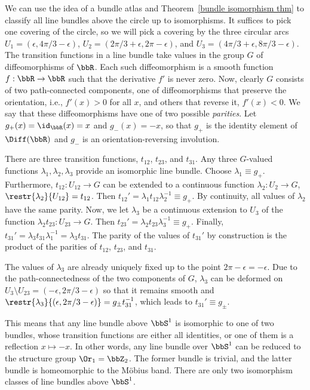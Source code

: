 \begin{example}\label{line bundles over S1}
    We can use the idea of a bundle atlas and Theorem~\ref{bundle isomorphism thm} to classify all line bundles above the circle up to isomorphisms. It suffices to pick one covering of the circle, so we will pick a covering by the three circular arcs $U_1=(\epsilon,4\pi/3-\epsilon)$, $U_2=(2\pi/3+\epsilon,2\pi-\epsilon)$, and $U_3=(4\pi/3+\epsilon,8\pi/3-\epsilon)$. The transition functions in a line bundle take values in the group $G$ of diffeomorphisms of $\bbR $. Each such diffeomorphism is a smooth function $f:\bbR \to\bbR $ such that the derivative $f'$ is never zero. Now, clearly $G$ consists of two path-connected components, one of diffeomorphisms that preserve the orientation, i.e., $f'(x)>0$ for all $x$, and others that reverse it, $f'(x)<0$. We say that these diffeomorphisms have one of two possible \emph{parities}. Let $g_+(x)=\id_{\bbR }(x)=x$ and $g_-(x)=-x$, so that $g_+$ is the identity element of $\Diff(\bbR )$ and $g_-$ is an orientation-reversing involution.

    There are three transition functions, $t_{12}$, $t_{23}$, and $t_{31}$. Any three $G$-valued functions $\lambda_1,\lambda_2,\lambda_3$ provide an isomorphic line bundle. Choose $\lambda_1\equiv g_+$. Furthermore, $t_{12}:U_{12}\to G$ can be extended to a continuous function $\lambda_2: U_2\to G$, $\restr{\lambda_2}{U_{12}}=t_{12}$. Then $t_{12}'=\lambda_1 t_{12}\lambda_2^{-1}\equiv g_+$. By continuity, all values of $\lambda_2$ have the same parity.  Now, we let $\lambda_3$ be a continuous extension to $U_3$ of the function $\lambda_2 t_{23}:U_{23}\to G$. Then $t_{23}'=\lambda_2 t_{23} \lambda_3^{-1}\equiv g_+$. Finally, $t_{31}'=\lambda_3 t_{31} \lambda_1^{-1}=\lambda_3 t_{31}$.  The parity of the values of $t_{31}'$ by construction is the product of the parities of $t_{12}$, $t_{23}$, and $t_{31}$.

    The values of $\lambda_3$ are already uniquely fixed up to the point $2\pi-\epsilon=-\epsilon$. Due to the path-connectedness of the two components of $G$, $\lambda_3$ can be deformed on $U_3\setminus U_{23}=(-\epsilon,2\pi/3-\epsilon)$ so that it remains smooth and $\restr{\lambda_3}{(\epsilon,2\pi/3-\epsilon)}=g_\pm t_{31}^{-1}$, which leads to $t_{31}'\equiv g_\pm$.

    This means that any line bundle above $\bbS^1$ is isomorphic to one of two bundles, whose transition functions are either all identities, or one of them is a reflection $x\mapsto -x$.  In other words, any line bundle over $\bbS^1$ can be reduced to the structure group $\Or_1=\bbZ_2$. The former bundle is trivial, and the latter bundle is homeomorphic to the M\"obius band. There are only two isomorphism classes of line bundles above $\bbS^1$.
\end{example}

